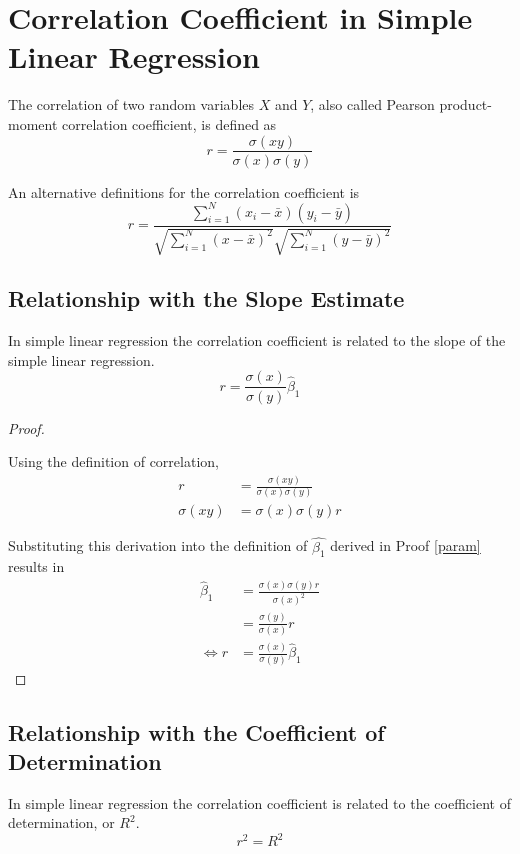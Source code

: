 \clearpage
\section{Correlation Coefficient in Simple Linear Regression}
The correlation of two random variables $X$ and $Y$, also called Pearson product-moment correlation coefficient, is defined as
\[
r=\frac{\sigma(xy)}{\sigma(x)\sigma(y)}
\]

An alternative definitions for the correlation coefficient is
\[
r=\frac{\sum_{i=1}^{N}(x_i-\bar{x})(y_i-\bar{y})}{\sqrt{\sum_{i=1}^{N}(x-\bar{x})^2}\sqrt{\sum_{i=1}^{N}(y-\bar{y})^2}}
\]

\subsection{Relationship with the Slope Estimate}
In simple linear regression the correlation coefficient is related to the slope of the simple linear regression.
\[r=\frac{\sigma(x)}{\sigma(y)}\hat{\beta}_1\]

\begin{proof}
\label{slope}

Using the definition of correlation,
\begin{align*}
r           &=\frac{\sigma(xy)}{\sigma(x)\sigma(y)}\\
\sigma(xy)  &=\sigma(x)\sigma(y)r
\end{align*}

Substituting this derivation into the definition of $\hat{\beta_1}$ derived in Proof \ref{param} results in
\begin{align*}
\hat{\beta}_1       &=\frac{\sigma(x)\sigma(y)r}{\sigma(x)^2} \\
                    &=\frac{\sigma(y)}{\sigma(x)}r \\
 \Leftrightarrow r  &=\frac{\sigma(x)}{\sigma(y)}\hat{\beta}_1
\end{align*}
\end{proof}

\subsection{Relationship with the Coefficient of Determination}
In simple linear regression the correlation coefficient is related to the coefficient of determination, or $R^2$.
\[
r^2=R^2
\]

